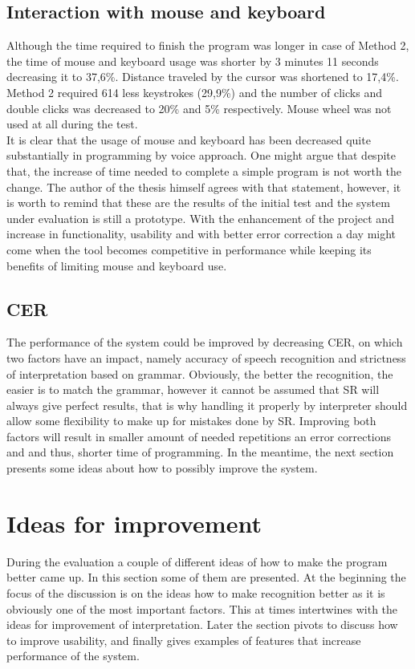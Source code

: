 \subsection{Interaction with mouse and keyboard}
Although the time required to finish the program was longer in case of Method 2, the time of mouse and keyboard usage was shorter by 3 minutes 11 seconds decreasing it to 37,6\%. Distance traveled by the cursor was shortened to 17,4\%. Method 2 required 614 less keystrokes (29,9\%) and the number of clicks and double clicks was decreased to 20\% and 5\% respectively. Mouse wheel was not used at all during the test. \\
It is clear that the usage of mouse and keyboard has been decreased quite substantially in programming by voice approach. One might argue that despite that, the increase of time needed to complete a simple program is not worth the change. The author of the thesis himself agrees with that statement, however, it is worth to remind that these are the results of the initial test and the system under evaluation is still a prototype. With the enhancement of the project and increase in functionality, usability and with better error correction a day might come when the tool becomes competitive in performance while keeping its benefits of limiting mouse and keyboard use. 

\subsection{CER}
The performance of the system could be improved by decreasing CER, on which two factors have an impact, namely accuracy of speech recognition and strictness of interpretation based on grammar. Obviously, the better the recognition, the easier is to match the grammar, however it cannot be assumed that SR will always give perfect results, that is why handling it properly by interpreter should allow some flexibility to make up for mistakes done by SR. Improving both factors will result in smaller amount of needed repetitions an error corrections and and thus, shorter time of programming. In the meantime, the next section presents some ideas about how to possibly improve the system.


\section{Ideas for improvement}
During the evaluation a couple of different ideas of how to make the program better came up. In this section some of them are presented. At the beginning the focus of the discussion is on the ideas how to make recognition better as it is obviously one of the most important factors. This at times intertwines with the ideas for improvement of interpretation. Later the section pivots to discuss how to improve usability, and finally gives examples of features that increase performance of the system.

